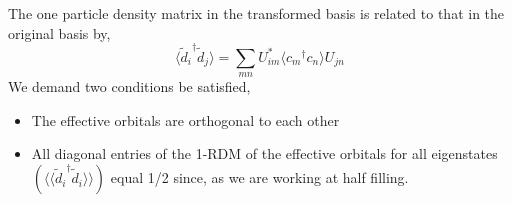 \documentclass[prl,12pt,onecolumn,nofootinbib,notitlepage,english,superscriptaddress]{revtex4-1}
\begin{document}
The one particle density matrix in the transformed basis is related 
to that in the original basis by,
\begin{equation}
	\langle {\tilde{d}_i}^{\dagger} \tilde{d}_{j} \rangle = \sum_{mn} U^{*}_{im} \langle {c_m}^{\dagger} c_n \rangle U_{jn}
\end{equation}
We demand two conditions be satisfied,
\begin{itemize} 
 \item The effective orbitals are orthogonal to each other 
 \item All diagonal entries of the 1-RDM of the effective orbitals for all eigenstates 
       $(\langle \langle {\tilde{d}_i}^{\dagger} \tilde{d}_{i} \rangle \rangle)$ 
       equal 1/2 since, as we are working at half filling.
\end{itemize} 
\end{document}
